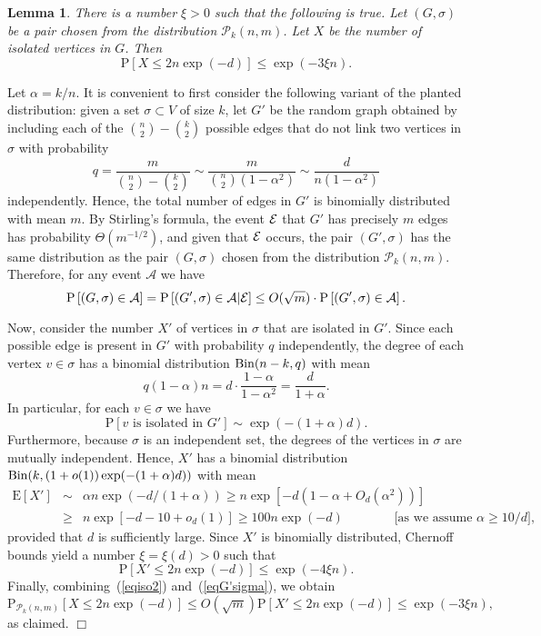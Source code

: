 \documentclass[a4paper,10pt]{article}
\makeatletter
\newtheorem{lemma}{Lemma}\renewcommand{\thelemma}{\arabic{lemma}}
\newenvironment{proof}{\noindent{\bf Proof\@:}}{\hfill $\Box$\\}
\newcommand\cA{\mathcal{A}}
\newcommand\cE{\mathcal{E}}
\newcommand\cP{\mathcal{P}}
\def\cE{{\cal E}}
\newcommand\Erw{\mathrm{E}}
\newcommand\pr{\mathrm{P}}
\newcommand{\Bin}{{\rm Bin}}
\newcommand{\bink}[2] {{{#1}\choose {#2}}}
\newcommand\bc[1]{\left({#1}\right)}
\newcommand\brk[1]{\left\lbrack{#1}\right\rbrack}
\makeatother
\begin{document}
\begin{lemma}\label{Lemma_isoPnm}
There is a number $\xi>0$ such that the following is true. Let
$(G,\sigma)$ be a pair chosen from the distribution $\cP_k(n,m)$.
Let $X$ be the number of isolated vertices in $G$. Then
\begin{equation}\label{eqiso1}
	\pr\brk{X\leq2n\exp(-d)}\leq\exp(-3\xi n).
\end{equation}
\end{lemma}
\begin{proof}
Let $\alpha=k/n$. It is convenient to first consider the following
variant of the planted distribution: given a set $\sigma\subset V$
of size $k$, let $G'$ be the random graph obtained by including each
of the $\bink n2-\bink k2$ possible edges that do not link two
vertices in $\sigma$ with probability
$$q=\frac{m}{\bink{n}2-\bink{k}2}\sim\frac{m}{\bink{n}2(1-\alpha^2)}\sim\frac{d}{n(1-\alpha^2)}$$
independently. Hence, the total number of edges in $G'$ is binomially
distributed with mean $m$. By Stirling's formula, the event $\cE$
that $G'$ has precisely $m$ edges has probability $\Theta(m^{-1/2})$,
and given that $\cE$ occurs, the pair $(G',\sigma)$ has the same
distribution as the pair $(G,\sigma)$ chosen from the distribution
$\cP_k(n,m)$. Therefore, for any event $\cA$ we have 
\begin{equation}\label{eqG'sigma}
	\pr\brk{(G,\sigma)\in\cA}=\pr\brk{(G',\sigma)\in\cA|\cE}
		\leq O(\sqrt m)\cdot\pr\brk{(G',\sigma)\in\cA}.
\end{equation}


\noindent
Now, consider the number $X'$ of vertices in $\sigma$ that are
isolated in $G'$. Since each possible edge is present in $G'$
with probability $q$ independently, the degree of each vertex
$v\in\sigma$ has a binomial distribution $\Bin(n-k,q)$ with mean
$$q(1-\alpha)n=d\cdot\frac{1-\alpha}{1-\alpha^2}=\frac d{1+\alpha}.$$
In particular, for each $v\in\sigma$ we have
$$\pr\brk{v\mbox{ is isolated in }G'}\sim\exp(-(1+\alpha)d).$$
Furthermore, because $\sigma$ is an independent set, the degrees
of the vertices in $\sigma$ are mutually independent. Hence, $X'$
has a binomial distribution $\Bin(k,(1+o(1))\exp(-(1+\alpha)d))$
with mean
\begin{eqnarray*}
	\Erw\brk{X'}&\sim&\alpha n\exp(-d/(1+\alpha))\geq n\exp\brk{-d\bc{1-\alpha+O_d(\alpha^2)}}\\
			&\geq&n\exp\brk{-d-10+o_d(1)}\geq100 n\exp(-d)\qquad\qquad\mbox{[as we assume $\alpha\geq10/d$]},
\end{eqnarray*}
provided that $d$ is sufficiently large. Since $X'$ is binomially 
distributed, Chernoff bounds yield a number $\xi=\xi(d)>0$ such
that 
\begin{equation}\label{eqiso2}
	\pr\brk{X'\leq2n\exp(-d)}\leq\exp(-4\xi n).
\end{equation}
Finally, combining~(\ref{eqiso2}) and~(\ref{eqG'sigma}), we obtain
$$\pr_{\cP_k(n,m)}\brk{X\leq2n\exp(-d)}\leq O(\sqrt m)\pr\brk{X'\leq2n\exp(-d)}\leq\exp(-3\xi n),$$
as claimed.
\end{proof}
\end{document}
